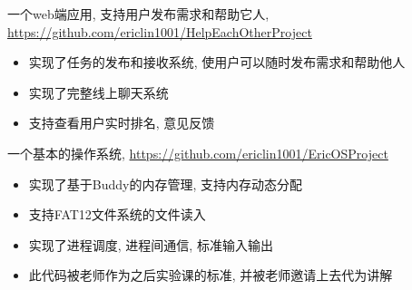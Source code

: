 \documentclass{resume}
\begin{document}

一个web端应用, 支持用户发布需求和帮助它人, \url{https://github.com/ericlin1001/HelpEachOtherProject}
\begin{itemize}
	\item 实现了任务的发布和接收系统, 使用户可以随时发布需求和帮助他人	

	\item 实现了完整线上聊天系统
	\item 支持查看用户实时排名, 意见反馈
\end{itemize}

一个基本的操作系统, \url{https://github.com/ericlin1001/EricOSProject}
\begin{itemize}
	\item 实现了基于Buddy的内存管理, 支持内存动态分配 
	\item 支持FAT12文件系统的文件读入
	\item 实现了进程调度, 进程间通信, 标准输入输出
	\item 此代码被老师作为之后实验课的标准, 并被老师邀请上去代为讲解
\end{itemize}
\end{document}
